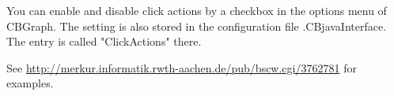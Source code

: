 You can enable and disable click actions by a checkbox in the options menu of
CBGraph. The setting is also stored in the configuration file .CBjavaInterface.
The entry is called "ClickActions" there.

See
\url{http://merkur.informatik.rwth-aachen.de/pub/bscw.cgi/3762781}
for examples.








